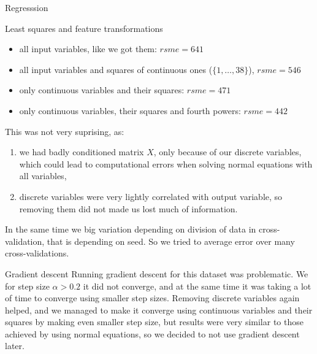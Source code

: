 \documentclass{article}
\begin{document}
\begin{section}{Regresssion}
\begin{subsection}{Least squares and feature transformations}
\begin{itemize}
\item all input variables, like we got them: $rsme=641$
\item all input variables and squares of continuous ones ($\{1, \ldots, 38\}$), $rsme = 546$
\item only continuous variables and their squares: $rsme = 471$
\item only continuous variables, their squares and fourth powers: $rsme = 442$
\end{itemize}
This was not very suprising, as:
\begin{enumerate}
\item we had badly conditioned matrix $X$, only because of our discrete variables, which could lead to computational errors when solving normal equations with all variables,
\item discrete variables were very lightly correlated with output variable, so removing them did not made us lost much of information.
\end{enumerate}
In the same time we big variation depending on division of data in cross-validation, that is depending on seed. So we tried to average error over many cross-validations. 
\end{subsection}
\begin{subsection}{Gradient descent}
Running gradient descent for this dataset was problematic. We for step size $\alpha > 0.2$ it did not converge, and at the same time it was taking a lot of time to converge using smaller step sizes. Removing discrete variables again helped, and we managed to make it converge using continuous variables and their squares by making even smaller step size, but results were very similar to those achieved by using normal equations, so we decided to not use gradient descent later.


\end{subsection}
\end{section}
\end{document}
